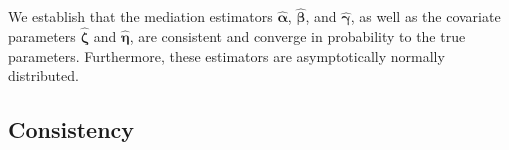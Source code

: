 \documentclass[
  12pt]{article}
\begin{document}

We establish that the mediation estimators $\widehat{\bm{\alpha}}$, $\widehat{\bm{\beta}}$, and $\widehat{\bm{\gamma}}$, as well as the covariate parameters $\widehat{\bm{\zeta}}$ and $\widehat{\bm{\eta}}$, are consistent and converge in probability to the true parameters. Furthermore, these estimators are asymptotically normally distributed.
\subsection{Consistency}
\label{subsec:model.selection.consistency}
\end{document}
